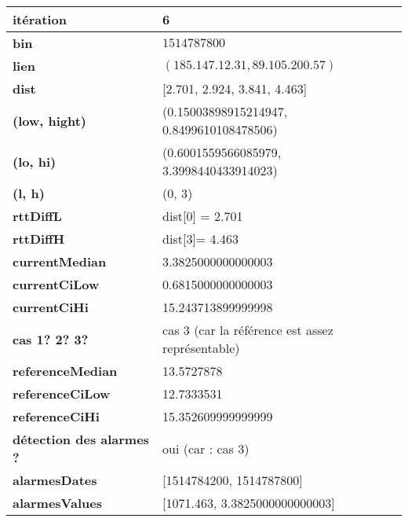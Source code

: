 	\begin{table}[H]
	\centering
	
	\begin{tabularx}{\linewidth}{|l|X| }
		\hline
		\textbf{itération} & 6	\\ \hline
		\textbf{bin} & $1514787800$ \\ \hline
		\textbf{lien} & $(185.147.12.31, 89.105.200.57)$  \\ \hline
		\textbf{dist}& [2.701, 2.924, 3.841, 4.463]	\\ \hline
		\textbf{(low, hight)}& (0.15003898915214947, 0.8499610108478506) 	\\ \hline
		\textbf{(lo, hi)}&(0.6001559566085979, 3.3998440433914023)  \\ \hline
		\textbf{(l, h)} & (0, 3) 	\\ \hline
		\textbf{rttDiffL}& dist[0] = 2.701	\\ \hline
		\textbf{rttDiffH}& dist[3]= 4.463	\\ \hline
		\textbf{currentMedian}&  3.3825000000000003	\\ \hline
		\textbf{currentCiLow}& 0.6815000000000003 	\\ \hline
		\textbf{currentCiHi}& 15.243713899999998	\\ \hline
		\textbf{cas 1? 2? 3?}& cas 3 (car la référence est assez représentable)  \\ \hline
		\textbf{referenceMedian}& 13.5727878 	\\ \hline
		\textbf{referenceCiLow}&  12.7333531	\\ \hline
		\textbf{referenceCiHi}& 15.352609999999999 	\\ \hline
		\textbf{détection des alarmes ?}& oui (car : cas 3)	\\ \hline
		\textbf{alarmesDates}& [1514784200, 1514787800]	\\ \hline
		\textbf{alarmesValues}& [1071.463, 3.3825000000000003]	\\ \hline
	\end{tabularx}
\end{table}




